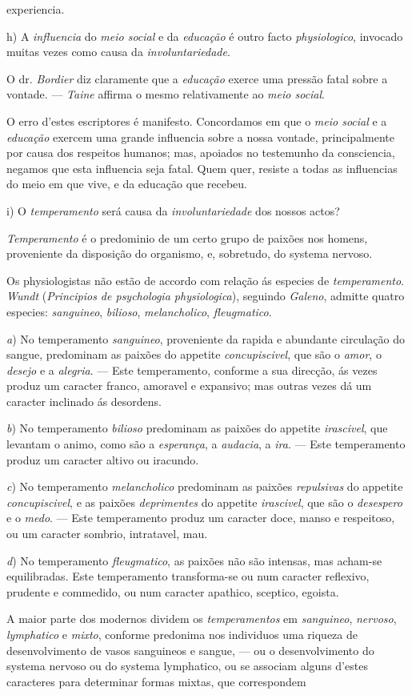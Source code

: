 experiencia.\par h) A \emph{influencia} do \emph{meio social} e da \emph{educação} é outro facto \emph{physiologico}, invocado muitas vezes como causa da \emph{involuntariedade}.\par O dr. \emph{Bordier} diz claramente que a \emph{educação} exerce uma pressão fatal sobre a vontade. --- \emph{Taine} affirma o mesmo relativamente ao \emph{meio social}.\par O erro d'estes escriptores é manifesto. Concordamos em que o \emph{meio social} e a \emph{educação} exercem uma grande influencia sobre a nossa vontade, principalmente por causa dos respeitos humanos; mas, apoiados no testemunho da consciencia, negamos que esta influencia seja fatal. Quem quer, resiste a todas as influencias do meio em que vive, e da educação que recebeu.\par i) O \emph{temperamento} será causa da \emph{involuntariedade} dos nossos actos?\par \emph{Temperamento} é o predominio de um certo grupo de paixões nos homens, proveniente da disposição do organismo, e, sobretudo, do systema nervoso.\par Os physiologistas não estão de accordo com relação ás especies de \emph{temperamento}. \emph{Wundt} (\emph{Principios de psychologia physiologica}), seguindo \emph{Galeno}, admitte quatro especies: \emph{sanguineo}, \emph{bilioso}, \emph{melancholico}, \emph{fleugmatico}.\par \emph{a}) No temperamento \emph{sanguineo}, proveniente da rapida e abundante circulação do sangue, predominam as paixões do appetite \emph{concupiscivel}, que são o \emph{amor}, o \emph{desejo} e a \emph{alegria}. --- Este temperamento, conforme a sua direcção, ás vezes produz um caracter franco, amoravel e expansivo; mas outras vezes dá um caracter inclinado ás desordens.\par \emph{b}) No temperamento \emph{bilioso} predominam as paixões do appetite \emph{irascivel}, que levantam o animo, como são a \emph{esperança}, a \emph{audacia}, a \emph{ira}. --- Este temperamento produz um caracter altivo ou iracundo.\par \emph{c}) No temperamento \emph{melancholico} predominam as paixões \emph{repulsivas} do appetite \emph{concupiscivel}, e as paixões \emph{deprimentes} do appetite \emph{irascivel}, que são o \emph{desespero} e o \emph{medo}. --- Este temperamento produz um caracter doce, manso e respeitoso, ou um caracter sombrio, intratavel, mau.\par \emph{d}) No temperamento \emph{fleugmatico}, as paixões não são intensas, mas acham-se equilibradas. Este temperamento transforma-se ou num caracter reflexivo, prudente e commedido, ou num caracter apathico, sceptico, egoista.\par A maior parte dos modernos dividem os \emph{temperamentos} em \emph{sanguineo}, \emph{nervoso}, \emph{lymphatico} e \emph{mixto}, conforme predonima nos individuos uma riqueza de desenvolvimento de vasos sanguineos e sangue, --- ou o desenvolvimento do systema nervoso ou do systema lymphatico, ou se associam alguns d'estes caracteres para determinar formas mixtas, que correspondem 